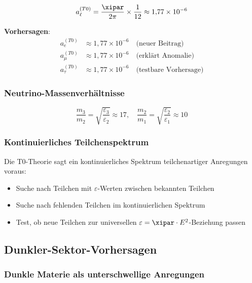	\begin{equation}
		a_\ell^{(T0)} = \frac{\xipar}{2\pi} \times \frac{1}{12} \approx 1{,}77 \times 10^{-6}
		\label{eq:universal_lepton_correction}
	\end{equation}
	
	\textbf{Vorhersagen}:
	\begin{align}
		a_e^{(T0)} &\approx 1{,}77 \times 10^{-6} \quad \text{(neuer Beitrag)} \\
		a_\mu^{(T0)} &\approx 1{,}77 \times 10^{-6} \quad \text{(erklärt Anomalie)} \\
		a_\tau^{(T0)} &\approx 1{,}77 \times 10^{-6} \quad \text{(testbare Vorhersage)}
	\end{align}
	
	\subsubsection{Neutrino-Massenverhältnisse}
	
	\begin{equation}
		\frac{m_3}{m_2} = \sqrt{\frac{\varepsilon_3}{\varepsilon_2}} \approx 17, \quad \frac{m_2}{m_1} = \sqrt{\frac{\varepsilon_2}{\varepsilon_1}} \approx 10
		\label{eq:neutrino_mass_ratios}
	\end{equation}
	
	\subsubsection{Kontinuierliches Teilchenspektrum}
	
	Die T0-Theorie sagt ein kontinuierliches Spektrum teilchenartiger Anregungen voraus:
	
	\begin{itemize}
		\item Suche nach Teilchen mit $\varepsilon$-Werten zwischen bekannten Teilchen
		\item Suche nach fehlenden Teilchen im kontinuierlichen Spektrum
		\item Test, ob neue Teilchen zur universellen $\varepsilon = \xipar \cdot E^2$-Beziehung passen
	\end{itemize}
	
	\subsection{Dunkler-Sektor-Vorhersagen}
	
	\subsubsection{Dunkle Materie als unterschwellige Anregungen}
	
